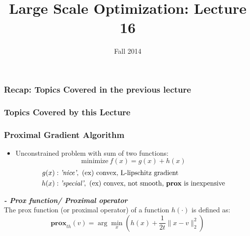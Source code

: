 \documentclass{beamer}
\date{}
\title{Large Scale Optimization: Lecture 16}
\author{Fall 2014}
\institute[]{The University of Texas at Austin}
\begin{document}
\begin{frame}
  \titlepage
\end{frame}

\begin{frame}
  \frametitle{Recap: Topics Covered in the previous lecture}

\end{frame}



\begin{frame}
\frametitle{Topics Covered by this Lecture}

\end{frame}

\begin{frame}
\frametitle{Proximal Gradient Algorithm}
\begin{itemize}
\item Unconstrained problem with sum of two functions:
\begin{equation}
\textrm{minimize}~f(x)=g(x)+h(x)
\end{equation}
\vspace{-2.5em}
\begin{align*}
g(x)&: \textit{'nice'}, \text{ (ex) convex, L-lipschitz gradient}\\
h(x)&: \textit{'special'}, \text{ (ex) convex, not smooth, \textbf{prox} is inexpensive}
\end{align*}
\end{itemize}
\begin{definition}
\textbf{\em{- Prox function/ Proximal operator}}\\
The prox function (or proximal operator) of a function $h(\cdot)$ is defined as:
\begin{equation}
\textbf{prox}_{th}(v) = \arg\min_{x} \left( h(x)+\frac{1}{2t}\|x-v\|_2^2 \right)
\end{equation}
\end{definition}

\end{frame}
\end{document}
